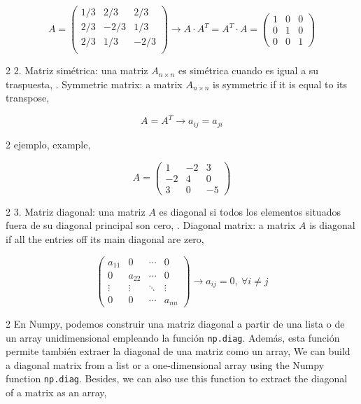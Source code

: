 \begin{equation*}
A=\begin{pmatrix}
1/3& 2/3& 2/3\\
2/3& -2/3& 1/3\\
2/3& 1/3& -2/3\\
\end{pmatrix} \rightarrow A\cdot A^T =A^T\cdot A= \begin{pmatrix}
1& 0& 0\\
0& 1& 0\\
0& 0& 1
\end{pmatrix}
\end{equation*}
\begin{paracol}{2}
2. Matriz simétrica: una matriz $A_{n\times n}$ es simétrica cuando es igual a su traspuesta,
. Symmetric matrix: a matrix $A_{n\times n}$ is symmetric if it is equal to its transpose,
\end{paracol}
\begin{equation*}
A=A^T \rightarrow a_{ij}=a_{ji}
\end{equation*}
\begin{paracol}{2}
ejemplo,
\switchcolumn
example,
\end{paracol}
\begin{equation*}
A=\begin{pmatrix}
1& -2& 3\\
-2& 4& 0\\
3& 0& -5
\end{pmatrix}
\end{equation*}
\begin{paracol}{2}
3. Matriz diagonal: una matriz $A$ es diagonal si todos los elementos situados fuera de su diagonal principal son cero,
. Diagonal matrix: a matrix $A$ is diagonal if all the entries off its main diagonal are zero,
\end{paracol}

\begin{equation*}
\begin{pmatrix}
a_{11}& 0& \cdots & 0\\
0& a_{22}& \cdots & 0\\
\vdots & \vdots & \ddots & \vdots\\
0& 0& \cdots & a_{nn}
\end{pmatrix} \rightarrow
a_{ij}=0,\ \forall i\neq j
\end{equation*}

\begin{paracol}{2}
En Numpy, podemos construir una matriz diagonal a partir de una lista o de un array unidimensional empleando la función \texttt{np.diag}. Además, esta función permite también extraer la diagonal de una matriz como un array,
\switchcolumn
We can build a diagonal matrix from a list or a one-dimensional array using the Numpy function \texttt{np.diag}. Besides, we can also use this function to extract the diagonal of a matrix as an array,
\end{paracol}

